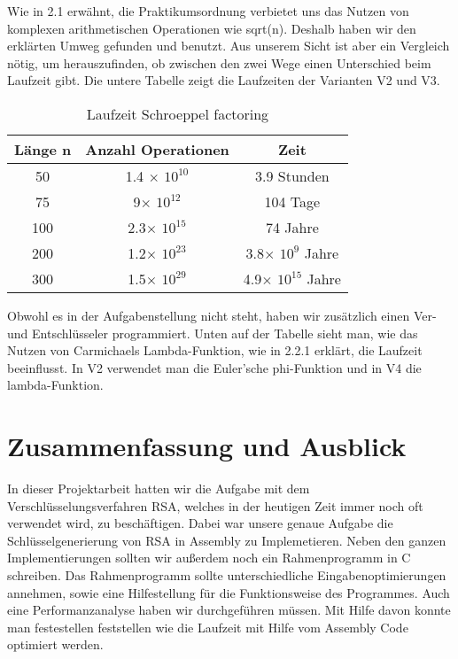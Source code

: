 \documentclass[course=asp]{aspdoc}
\begin{document}
Wie in 2.1 erwähnt, die Praktikumsordnung verbietet uns das Nutzen von komplexen arithmetischen Operationen wie sqrt(n). Deshalb haben wir den erklärten Umweg gefunden und benutzt. Aus unserem Sicht ist aber ein Vergleich nötig, um herauszufinden, ob zwischen den zwei Wege einen Unterschied beim Laufzeit gibt. Die untere Tabelle zeigt die Laufzeiten der Varianten V2 und V3.

\begin{table}[H]
\centering
   \begin{tabular}{||c c c||} 
 \hline
 Länge n & Anzahl Operationen & Zeit  \\ [0.5ex] 
 \hline\hline
 50 & 1.4 $\times$ $10^{10}$  & 3.9 Stunden  \\ 
 \hline
 75 & 9$\times $ $10^{12}$  & 104 Tage  \\
 \hline
 100 & 2.3$\times $ $10^{15}$ & 74 Jahre  \\
 \hline
 200 & 1.2$\times $ $10^{23}$ & 3.8$\times $ $10^{9}$ Jahre\\
 \hline
 300 & 1.5$\times $ $10^{29}$ & 4.9$\times $ $10^{15}$ Jahre \\ [1ex] 
 \hline

\end{tabular}
    \caption{Laufzeit Schroeppel factoring}
\end{table}

Obwohl es in der Aufgabenstellung nicht steht, haben wir zusätzlich einen Ver- und Entschlüsseler programmiert. Unten auf der Tabelle sieht man, wie das Nutzen von Carmichaels Lambda-Funktion, wie in 2.2.1 erklärt, die Laufzeit beeinflusst. In V2 verwendet man die Euler’sche phi-Funktion und in V4 die lambda-Funktion.


\section{Zusammenfassung und Ausblick}
In dieser Projektarbeit hatten wir die Aufgabe mit dem Verschlüsselungsverfahren RSA, welches in der heutigen Zeit immer noch oft verwendet wird, zu beschäftigen. Dabei war unsere genaue Aufgabe die Schlüsselgenerierung von RSA in Assembly zu Implemetieren. Neben den ganzen Implementierungen sollten wir außerdem noch ein Rahmenprogramm in C schreiben. Das Rahmenprogramm sollte unterschiedliche Eingabenoptimierungen annehmen, sowie eine Hilfestellung für die Funktionsweise des Programmes. Auch eine Performanzanalyse haben wir durchgeführen müssen. Mit Hilfe davon konnte man festestellen feststellen wie die Laufzeit mit Hilfe vom Assembly Code optimiert werden. 
\end{document}
